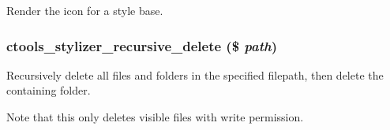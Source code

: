 \label{includes_2stylizer_8inc_af18de8af7efd4c7d25353101f67552d7}
Render the icon for a style base. \hypertarget{includes_2stylizer_8inc_a7d07ec4721d2c7c439f7daa904c63237}{
\subsubsection[{ctools\_\-stylizer\_\-recursive\_\-delete}]{\setlength{\rightskip}{0pt plus 5cm}ctools\_\-stylizer\_\-recursive\_\-delete (\$ {\em path})}}
\label{includes_2stylizer_8inc_a7d07ec4721d2c7c439f7daa904c63237}
Recursively delete all files and folders in the specified filepath, then delete the containing folder.

Note that this only deletes visible files with write permission.


